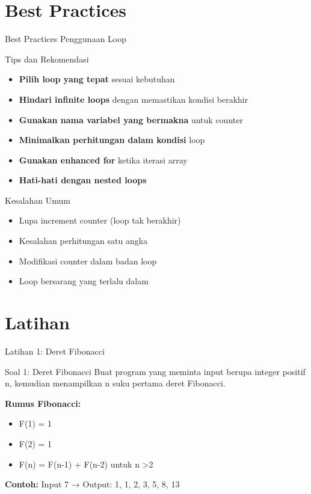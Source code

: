 \documentclass{beamer}
\begin{document}
\section{Best Practices}
\begin{frame}{Best Practices Penggunaan Loop}
  \begin{alertblock}{Tips dan Rekomendasi}
    \begin{itemize}
      \item \textbf{\scriptsize Pilih loop yang tepat} sesuai kebutuhan
      \item \textbf{\scriptsize Hindari infinite loops} dengan memastikan kondisi berakhir
      \item \textbf{\scriptsize Gunakan nama variabel yang bermakna} untuk counter
      \item \textbf{\scriptsize Minimalkan perhitungan dalam kondisi} loop
      \item \textbf{\scriptsize Gunakan enhanced for} ketika iterasi array
      \item \textbf{\scriptsize Hati-hati dengan nested loops}
    \end{itemize}
  \end{alertblock}
  
  \begin{block}{Kesalahan Umum}
    \begin{itemize}
      \item \scriptsize Lupa increment counter (loop tak berakhir)
      \item \scriptsize Kesalahan perhitungan satu angka
      \item \scriptsize Modifikasi counter dalam badan loop
      \item \scriptsize Loop bersarang yang terlalu dalam
    \end{itemize}
  \end{block}
\end{frame}

\section{Latihan}
\begin{frame}{Latihan 1: Deret Fibonacci}
  \begin{block}{Soal 1: Deret Fibonacci}
    Buat program yang meminta input berupa integer positif n, kemudian menampilkan n suku pertama deret Fibonacci.
    
    \textbf{Rumus Fibonacci:}
    \begin{itemize}
      \item F(1) = 1
      \item F(2) = 1  
      \item F(n) = F(n-1) + F(n-2) untuk n \textgreater 2
    \end{itemize}
    
    \textbf{Contoh:} Input 7 → Output: 1, 1, 2, 3, 5, 8, 13
  \end{block}
\end{frame}
\end{document}
